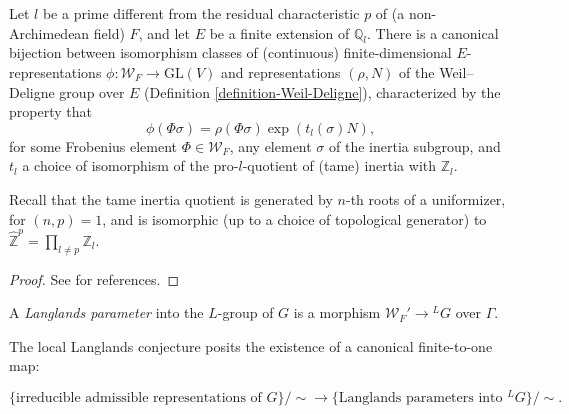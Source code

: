 \begin{proposition}
 \label{proposition-Weil-Deligne-representations}
Let $l$ be a prime different from the residual characteristic $p$ of (a non-Archimedean field) $F$, and let $E$ be a finite extension of $\mathbb Q_l$. There is a canonical bijection between isomorphism classes of (continuous) finite-dimensional $E$-representations $\phi:\mathcal W_F \to \text{GL}(V)$ and representations $(\rho, N)$ of the Weil--Deligne group over $E$ (Definition \ref{definition-Weil-Deligne}), characterized by the property that 
\begin{equation}
 \label{equation-Weil-Deligne-representations}
\phi(\Phi\sigma) = \rho(\Phi\sigma) \exp(t_l(\sigma) N),
\end{equation}
for some Frobenius element $\Phi\in \mathcal W_F$, any element $\sigma$ of the inertia subgroup, and $t_l$ a choice of isomorphism of the pro-$l$-quotient of (tame) inertia with $\mathbb Z_l$.
\end{proposition}

Recall that the tame inertia quotient is generated by $n$-th roots of a uniformizer, for $(n,p)=1$, and is isomorphic (up to a choice of topological generator) to $\widehat{\mathbb Z}^p = \prod_{l\ne p} \mathbb Z_l$.

\begin{proof}
 See \cite[\S 4.2]{Tate-Corvallis} for references.
\end{proof}






\begin{definition}
 \label{definition-Langlands-parameter}
A {\it Langlands parameter} into the $L$-group of $G$ is a morphism $\mathcal W_F'\to{^LG}$ over $\Gamma$.
\end{definition}




The local Langlands conjecture posits the existence of a canonical finite-to-one map:

$$\{\mbox{irreducible admissible representations of }G\}/\sim \to \{\mbox{Langlands parameters into }{^LG}\}/\sim.$$
















